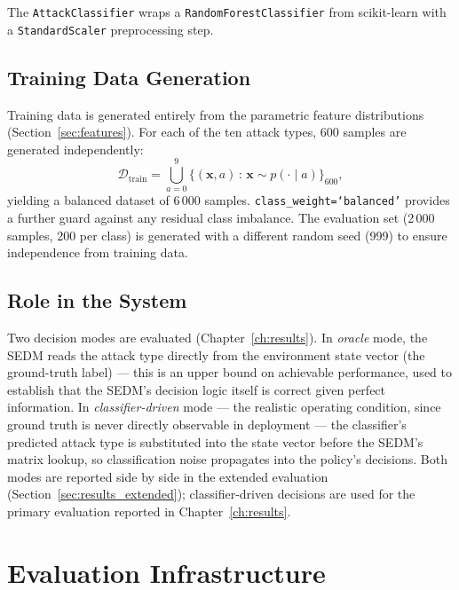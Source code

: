 The \texttt{AttackClassifier} wraps a \texttt{RandomForestClassifier} from
scikit-learn with a \texttt{StandardScaler} preprocessing step.

\subsection{Training Data Generation}

Training data is generated entirely from the parametric feature distributions
(Section~\ref{sec:features}).
For each of the ten attack types, 600 samples are generated independently:
%
\begin{equation}
  \mathcal{D}_{\text{train}} = \bigcup_{a=0}^{9}
  \bigl\{(\mathbf{x}, a) \,:\, \mathbf{x} \sim p(\cdot \mid a)\bigr\}_{600},
\end{equation}
%
yielding a balanced dataset of 6\,000 samples.
\texttt{class\_weight=`balanced'} provides a further guard against any
residual class imbalance.
The evaluation set (2\,000 samples, 200 per class) is generated with a
different random seed (999) to ensure independence from training data.

\subsection{Role in the System}

Two decision modes are evaluated (Chapter~\ref{ch:results}).
In \emph{oracle} mode, the SEDM reads the attack type directly from the
environment state vector (the ground-truth label) — this is an upper bound
on achievable performance, used to establish that the SEDM's decision logic
itself is correct given perfect information. In \emph{classifier-driven}
mode — the realistic operating condition, since ground truth is never
directly observable in deployment — the classifier's predicted attack type
is substituted into the state vector before the SEDM's matrix lookup, so
classification noise propagates into the policy's decisions. Both modes are
reported side by side in the extended evaluation
(Section~\ref{sec:results_extended}); classifier-driven decisions are used
for the primary evaluation reported in Chapter~\ref{ch:results}.

\section{Evaluation Infrastructure}
\label{sec:eval_infra}

